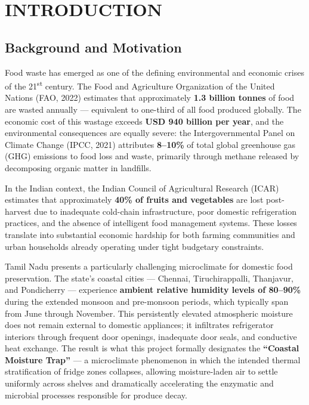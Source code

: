 \documentclass[12pt,a4paper]{report}
\begin{document}
\chapter{INTRODUCTION}

\section{Background and Motivation}

Food waste has emerged as one of the defining environmental and economic crises of the 21\textsuperscript{st} century. The Food and Agriculture Organization of the United Nations (FAO, 2022) \cite{fao2022} estimates that approximately \textbf{1.3 billion tonnes} of food are wasted annually — equivalent to one-third of all food produced globally. The economic cost of this wastage exceeds \textbf{USD 940 billion per year}, and the environmental consequences are equally severe: the Intergovernmental Panel on Climate Change (IPCC, 2021) \cite{ipcc2021} attributes \textbf{8--10\%} of total global greenhouse gas (GHG) emissions to food loss and waste, primarily through methane released by decomposing organic matter in landfills.

In the Indian context, the Indian Council of Agricultural Research (ICAR) estimates that approximately \textbf{40\% of fruits and vegetables} are lost post-harvest due to inadequate cold-chain infrastructure, poor domestic refrigeration practices, and the absence of intelligent food management systems. These losses translate into substantial economic hardship for both farming communities and urban households already operating under tight budgetary constraints.

Tamil Nadu presents a particularly challenging microclimate for domestic food preservation. The state's coastal cities — Chennai, Tiruchirappalli, Thanjavur, and Pondicherry — experience \textbf{ambient relative humidity levels of 80--90\%} during the extended monsoon and pre-monsoon periods, which typically span from June through November. This persistently elevated atmospheric moisture does not remain external to domestic appliances; it infiltrates refrigerator interiors through frequent door openings, inadequate door seals, and conductive heat exchange. The result is what this project formally designates the \textbf{``Coastal Moisture Trap''} — a microclimate phenomenon in which the intended thermal stratification of fridge zones collapses, allowing moisture-laden air to settle uniformly across shelves and dramatically accelerating the enzymatic and microbial processes responsible for produce decay.
\end{document}
